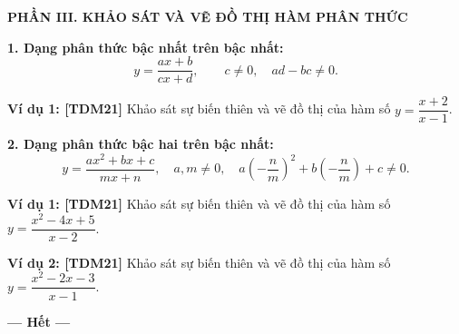 \documentclass[12pt,a4paper]{article}
\newcommand{\partheading}[1]{\par\vspace{5pt}\noindent\textbf{\textcolor{sectionpurple}{#1}}\par\vspace{1pt}}
\newcommand{\example}[2][TDM21]{\par\vspace{3pt}\noindent\textbf{\textcolor{sectionpurple}{Ví dụ #2:} \textcolor{noteborder}{[#1]}}\enspace}
\begin{document}
\partheading{PHẦN III. KHẢO SÁT VÀ VẼ ĐỒ THỊ HÀM PHÂN THỨC}
\textbf{1. Dạng phân thức bậc nhất trên bậc nhất:}
\[
  y=\frac{ax+b}{cx+d},\qquad c\ne0,\quad ad-bc\ne0.
\]
\begin{notebox}
\example{1} Khảo sát sự biến thiên và vẽ đồ thị của hàm số $y=\dfrac{x+2}{x-1}$.
\end{notebox}
\textbf{2. Dạng phân thức bậc hai trên bậc nhất:}
\[
  y=\frac{ax^2+bx+c}{mx+n},\quad a,m\ne0,\quad
  a\left(-\frac{n}{m}\right)^2+b\left(-\frac{n}{m}\right)+c\ne0.
\]
\begin{notebox}
\example{1} Khảo sát sự biến thiên và vẽ đồ thị của hàm số $y=\dfrac{x^2-4x+5}{x-2}$.
\end{notebox}
\begin{notebox}
\example{2} Khảo sát sự biến thiên và vẽ đồ thị của hàm số $y=\dfrac{x^2-2x-3}{x-1}$.
\end{notebox}
\vspace{1pt}
{\centering\textbf{\textcolor{sectionpurple}{--- Hết ---}}\par}
\end{document}
